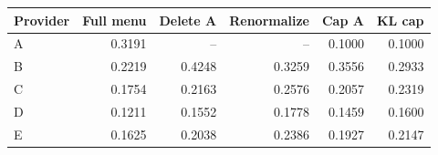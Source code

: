 \begin{tabular}{lrrrrr}
\toprule
Provider & Full menu & Delete A & Renormalize & Cap A & KL cap \\
\midrule
A & 0.3191 & -- & -- & 0.1000 & 0.1000 \\
B & 0.2219 & 0.4248 & 0.3259 & 0.3556 & 0.2933 \\
C & 0.1754 & 0.2163 & 0.2576 & 0.2057 & 0.2319 \\
D & 0.1211 & 0.1552 & 0.1778 & 0.1459 & 0.1600 \\
E & 0.1625 & 0.2038 & 0.2386 & 0.1927 & 0.2147 \\
\bottomrule
\end{tabular}
